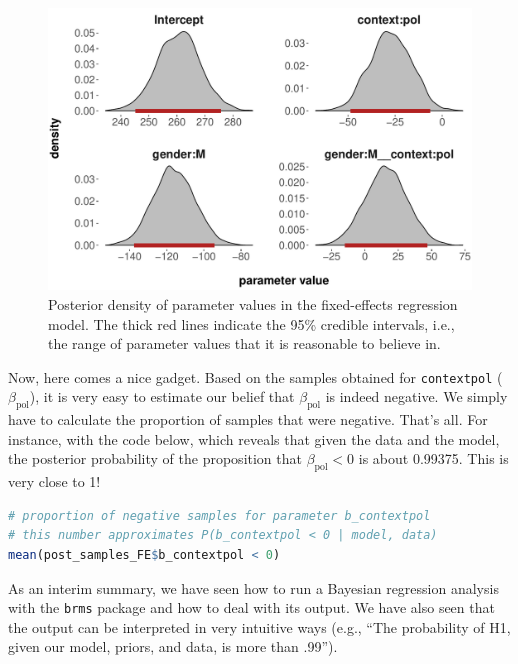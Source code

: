 \documentclass[nobib]{tufte-handout}
\begin{document}
\begin{figure}
  \centering
  \includegraphics[width=\textwidth]{pics/posterior_density_FE.pdf}
  \caption[Posterior over coefficients in fixed-effects model]{Posterior density of parameter
    values in the fixed-effects regression model. The thick red lines indicate the 95\%
    credible intervals, i.e., the range of parameter values that it is reasonable to believe
    in.}
  \label{fig:Posteriors_FE}
\end{figure}

Now, here comes a nice gadget. Based on the samples obtained for \texttt{contextpol} ($\beta_{\text{pol}}$), it is very easy to estimate our belief that $\beta_{\text{pol}}$ is indeed negative. We simply have to calculate the proportion of samples that were negative. That's all. For instance, with the code below, which reveals that given the data and the model, the posterior probability of the proposition that $\beta_{\text{pol}} < 0$ is about 0.99375. This is very close to 1!  

\bigskip

\begin{minipage}[]{\textwidth}
\begin{lstlisting}[language=R]
# proportion of negative samples for parameter b_contextpol
# this number approximates P(b_contextpol < 0 | model, data)
mean(post_samples_FE$b_contextpol < 0)
\end{lstlisting}
\end{minipage}

As an interim summary, we have seen how to run a Bayesian regression analysis with the
\texttt{brms} package and how to deal with its output. We have also seen that the output can be interpreted in very intuitive ways (e.g., ``The probability of H1, given our model, priors, and data, is more than .99'').
\end{document}
